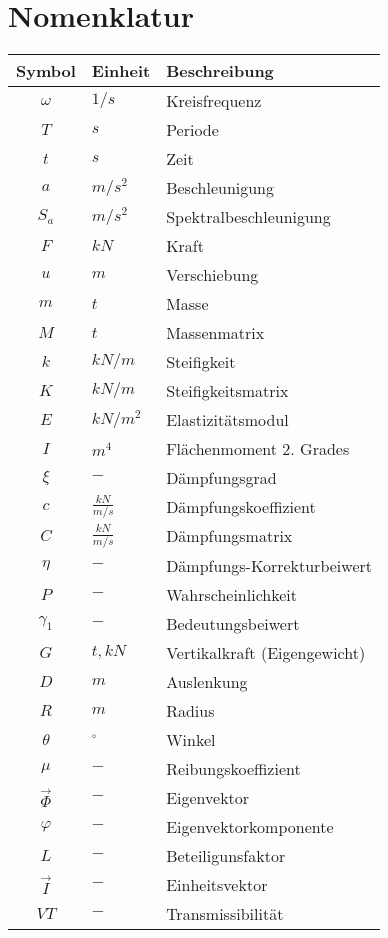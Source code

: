 \cleardoublepage
{}
{}

\chapter*{Nomenklatur}

\begin{longtable}{cp{3cm}p{8cm}}
\hline
Symbol       & Einheit & Beschreibung \\
\hline\hline
$\omega$     & $1/s$   & Kreisfrequenz\\
$T$          & $s$     & Periode      \\
$t$          & $s$     & Zeit         \\
$a$          & $m/s^2$ & Beschleunigung \\
$S_a$        & $m/s^2$ & Spektralbeschleunigung \\
$F$          & $kN$    & Kraft        \\
$u$          & $m$     & Verschiebung \\
$m$          & $t$     & Masse        \\
$M$          & $t$     & Massenmatrix \\
$k$          & $kN/m$  & Steifigkeit  \\
$K$          & $kN/m$  & Steifigkeitsmatrix \\
$E$          & $kN/m^2$& Elastizitätsmodul \\
$I$          & $m^4$   & Flächenmoment 2. Grades \\
$\xi$        & $-$     & Dämpfungsgrad     \\
$c$          & $\frac{kN}{m/s}$     & Dämpfungskoeffizient \\
$C$          & $\frac{kN}{m/s}$     & Dämpfungsmatrix \\
$\eta$       & $-$     & Dämpfungs-Korrekturbeiwert \\
$P$          & $-$     & Wahrscheinlichkeit \\
$\gamma_1$   & $-$     & Bedeutungsbeiwert \\
$G$          & $t, kN$ & Vertikalkraft (Eigengewicht) \\
$D$          & $m$     & Auslenkung \\
$R$          & $m$     & Radius \\
$\theta$     & $^{\circ}$ & Winkel \\
$\mu$        & $-$     & Reibungskoeffizient \\
$\vec{\Phi}$ & $-$     & Eigenvektor \\
$\varphi$       & $-$     & Eigenvektorkomponente \\
$L$          & $-$     & Beteiligunsfaktor \\
$\vec{I}$    & $-$     & Einheitsvektor \\
$VT$         & $-$     & Transmissibilität \\
\hline
\end{longtable}


